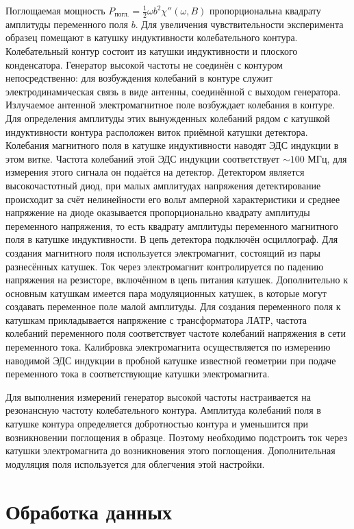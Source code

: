 \documentclass[a4paper,12pt]{article}
\begin{document}
Поглощаемая мощность $P_\text{погл.} = \frac{1}{2}\omega b^2\chi''(\omega , B)$ пропорциональна квадрату амплитуды переменного поля $b$. Для увеличения чувствительности эксперимента образец помещают в катушку индуктивности колебательного контура. Колебательный контур состоит из катушки индуктивности и плоского конденсатора. Генератор высокой частоты не соединён с контуром непосредственно: для возбуждения колебаний в контуре служит электродинамическая связь в виде антенны, соединённой с выходом генератора. Излучаемое антенной электромагнитное поле возбуждает колебания в контуре. Для определения амплитуды этих вынужденных колебаний рядом с катушкой индуктивности контура расположен виток приёмной катушки детектора. Колебания магнитного поля в катушке индуктивности наводят ЭДС индукции в этом витке. Частота колебаний этой ЭДС индукции соответствует $\sim100$ МГц, для измерения этого сигнала он подаётся на детектор. Детектором является высокочастотный диод, при малых амплитудах напряжения детектирование происходит за счёт нелинейности его вольт амперной характеристики и среднее напряжение на диоде оказывается пропорционально квадрату амплитуды переменного напряжения, то есть квадрату амплитуды переменного магнитного поля в катушке индуктивности. В цепь детектора подключён осциллограф. Для создания магнитного поля используется электромагнит, состоящий из пары разнесённых катушек. Ток через электромагнит контролируется по падению напряжения на резисторе, включённом в цепь питания катушек. Дополнительно к основным катушкам имеется пара модуляционных катушек, в которые могут создавать переменное поле малой амплитуды. Для создания переменного поля к катушкам прикладывается напряжение с трансформатора ЛАТР, частота колебаний переменного поля соответствует частоте колебаний напряжения в сети переменного тока. Калибровка электромагнита осуществляется по измерению наводимой ЭДС индукции в пробной катушке известной геометрии при подаче переменного тока в соответствующие катушки электромагнита.

Для выполнения измерений генератор высокой частоты настраивается на резонансную частоту колебательного контура. Амплитуда колебаний поля в катушке контура определяется добротностью контура и уменьшится при возникновении поглощения в образце. Поэтому
необходимо подстроить ток через катушки электромагнита до возникновения этого поглощения. Дополнительная модуляция поля используется для облегчения этой настройки.

\section{Обработка данных}
\end{document}
